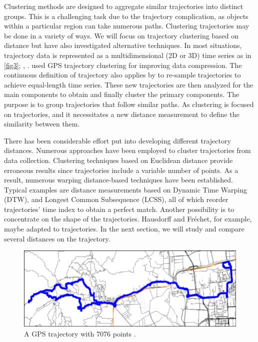 \documentclass[a4paper, 12pt]{article}
\begin{document}
Clustering methods are designed to aggregate similar trajectories into distinct groups. This is a challenging task due to the trajectory complication, as objects within a particular region can take numerous paths. Clustering trajectories may be done in a variety of ways. We will focus on trajectory clustering based on distance but have also investigated alternative techniques. In most situations, trajectory data is represented as a multidimensional (2D or 3D) time series as in \autoref{fig3}; \cite{gaffney1999trajectory}, \cite{vasquez2004motion}. \cite{chen2012compression} used GPS trajectory clustering for improving data compression. The continuous definition of trajectory also applies by \cite{gariel2011trajectory} to re-sample trajectories to achieve equal-length time series. These new trajectories are then analyzed for the main components to obtain and finally cluster the primary components. The purpose is to group trajectories that follow similar paths. As clustering is focused on trajectories, and it necessitates a new distance measurement to define the similarity between them.

There has been considerable effort put into developing different trajectory distances. Numerous approaches have been employed to cluster trajectories from data collection. Clustering techniques based on Euclidean distance provide erroneous results since trajectories include a variable number of points. As a result, numerous warping distance-based techniques have been established. Typical examples are distance measurements based on Dynamic Time Warping (DTW), and Longest Common Subsequence (LCSS), all of which reorder trajectories' time index to obtain a perfect match. Another possibility is to concentrate on the shape of the trajectories. Hausdorff and Fréchet, for example, maybe adapted to trajectories. In the next section, we will study and compare several distances on the trajectory. 

\begin{figure}[ht]
    \centering
    \includegraphics[width=1\textwidth]{Trajectory.png}
    \caption{A GPS trajectory with 7076 points \citep{qian2017simplifying}.}
    \label{fig3}
\end{figure}
\end{document}

